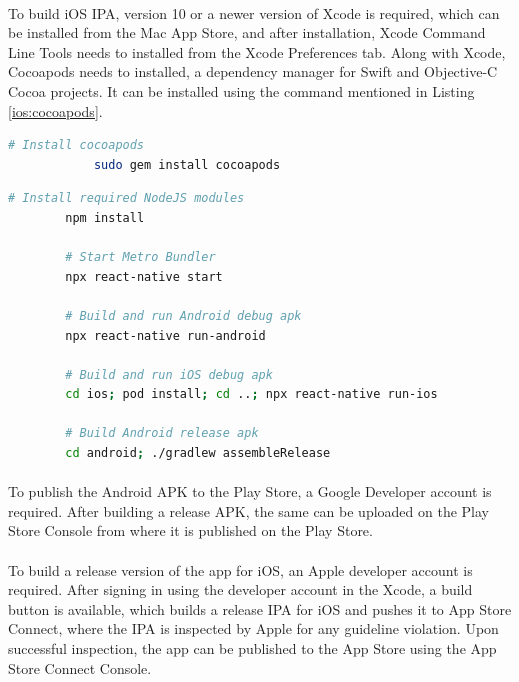 \documentclass{article}
\begin{document}
            \paragraph{}
            To build iOS IPA, version 10 or a newer version of Xcode is required, which can be installed from the Mac App Store, and after installation, Xcode Command Line Tools needs to installed from the Xcode Preferences tab. Along with Xcode, Cocoapods needs to installed, a dependency manager for Swift and Objective-C Cocoa projects. It can be installed using the command mentioned in Listing \ref{ios:cocoapods}.
        
            \begin{lstlisting}[language=bash, caption=Cocoapods installation, label=ios:cocoapods]
            # Install cocoapods
            sudo gem install cocoapods    
            \end{lstlisting}
        
        \begin{lstlisting}[language=bash, caption=Smartphone Application]
        # Install required NodeJS modules
        npm install
    
        # Start Metro Bundler
        npx react-native start
    
        # Build and run Android debug apk
        npx react-native run-android
        
        # Build and run iOS debug apk
        cd ios; pod install; cd ..; npx react-native run-ios
        
        # Build Android release apk
        cd android; ./gradlew assembleRelease
        \end{lstlisting}
        
        \paragraph{}
        To publish the Android APK to the Play Store, a Google Developer account is required. After building a release APK, the same can be uploaded on the Play Store Console from where it is published on the Play Store.
        \paragraph{}
        To build a release version of the app for iOS, an Apple developer account is required. After signing in using the developer account in the Xcode, a build button is available, which builds a release IPA for iOS and pushes it to App Store Connect, where the IPA is inspected by Apple for any guideline violation. Upon successful inspection, the app can be published to the App Store using the App Store Connect Console.
    
\end{document}
